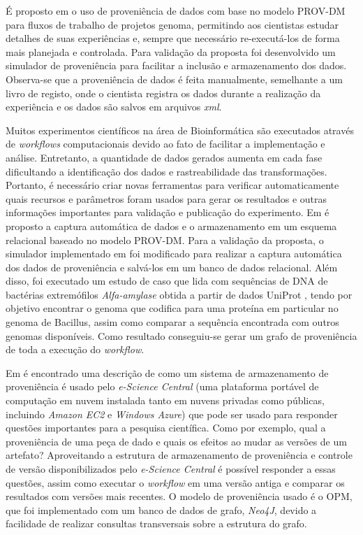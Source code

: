 É proposto em \cite{renato} o uso de proveniência de dados com base no modelo PROV-DM para fluxos de trabalho de projetos genoma, permitindo aos cientistas estudar detalhes de suas experiências e, sempre que necessário re-executá-los de forma mais planejada e controlada. Para validação da proposta foi desenvolvido um simulador de proveniência para facilitar a inclusão e armazenamento dos dados. Observa-se que a proveniência de dados é feita manualmente, semelhante a um livro de registo, onde o cientista registra os dados durante a realização da experiência e os dados são salvos em arquivos \textit{xml}.

Muitos experimentos científicos na área de Bioinformática são executados através de \textit{workflows} computacionais devido ao fato de facilitar a implementação e análise. Entretanto, a quantidade de dados gerados aumenta em cada fase dificultando a identificação dos dados e rastreabilidade das transformações. Portanto, é necessário criar novas ferramentas para verificar automaticamente quais recursos e parâmetros foram usados para gerar os resultados e outras informações importantes para validação e publicação do experimento. Em \cite{rodrigo} é proposto a captura automática de dados e o armazenamento em um esquema relacional baseado no modelo PROV-DM. Para a validação da proposta, o simulador implementado em \cite{renato} foi modificado para realizar a captura automática dos dados de proveniência e salvá-los em um banco de dados relacional. Além disso, foi executado um estudo de caso que lida com sequências de DNA de bactérias extremófilos \textit{Alfa-amylase} obtida a partir de dados UniProt \cite{uniprot}, tendo por objetivo encontrar o genoma que codifica para uma proteína em particular no genoma de Bacillus, assim como comparar a sequência encontrada com outros genomas disponíveis. Como resultado conseguiu-se gerar um grafo de proveniência de toda a execução do \textit{workflow}.

Em \cite{simon} é encontrado uma descrição de como um sistema de armazenamento de proveniência é usado pelo \textit{e-Science Central}  (uma plataforma portável de computação em nuvem instalada tanto em nuvens privadas como públicas, incluindo \textit{Amazon EC2} e \textit{Windows Azure}) que pode ser usado para responder questões importantes para a pesquisa científica. Como por exemplo, qual a proveniência de uma peça de dado e quais os efeitos ao mudar as versões de um artefato? Aproveitando a estrutura de armazenamento de proveniência e controle de versão disponibilizados pelo \textit{e-Science Central} é possível responder a essas questões, assim como executar o \textit{workflow} em uma versão antiga e comparar os resultados com versões mais recentes. O modelo de proveniência usado é o OPM, que foi implementado com um banco de dados de grafo, \textit{Neo4J}, devido a facilidade de realizar consultas transversais sobre a estrutura do grafo. 

